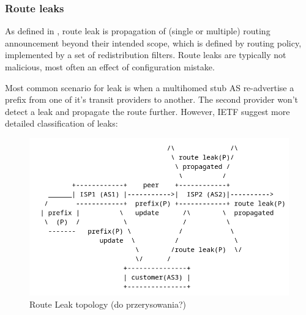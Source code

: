 \subsubsection{Route leaks}
\label{def:tax:rl}
As defined in \cite{rfc7908}, route leak is propagation of (single or multiple) routing announcement beyond their intended scope, which is defined by routing policy, implemented by a set of redistribution filters. Route leaks are typically not malicious, most often an effect of configuration mistake. 

Most common scenario for leak is when a multihomed stub AS re-advertise a prefix from one of it's transit providers to another. The second provider won't detect a leak and propagate the route further. However, IETF suggest more detailed classification of leaks:

\begin{figure}[ht]
    \begin{center}
   \includegraphics[width = 0.8\linewidth]{./img/route-leak-topology.png}
    \end{center}
    \caption{Route Leak topology \cite{rfc7908} (do przerysowania?) \label{fig:routeleak}}
\end{figure}

